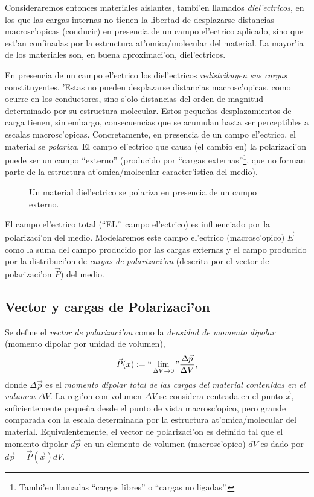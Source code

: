 Consideraremos entonces materiales aislantes, tambi'en llamados \textit{diel'ectricos}, en los que las cargas internas no tienen la
libertad de desplazarse distancias macrosc'opicas (conducir) en presencia de un
campo el'ectrico aplicado, sino que est'an confinadas por la estructura
at'omica/molecular del material. La mayor'ia de los materiales son, en buena
aproximaci'on, diel'ectricos.

En presencia de un campo el'ectrico los diel'ectricos \textit{redistribuyen sus cargas} constituyentes. 'Estas no pueden desplazarse distancias macrosc'opicas,
como ocurre en los conductores, sino s'olo distancias del orden de magnitud determinado por su estructura molecular.
Estos peque\~nos desplazamientos de carga tienen, sin embargo, consecuencias
que se acumulan hasta ser perceptibles a escalas macrosc'opicas.
Concretamente, en presencia de un campo el'ectrico, el material
se \textit{polariza}.
El campo el'ectrico que causa (el cambio en) la polarizaci'on puede ser un campo ``externo'' (producido por ``cargas externas''\footnote{Tambi'en llamadas ``cargas libres'' o ``cargas no ligadas''.}, que no forman parte
de la estructura at'omica/molecular caracter'istica del medio).
\begin{figure}[!h]
\centerline{}
\caption{Un material diel'ectrico se polariza en presencia de un campo externo.}
\label{diel01}
\end{figure}

El campo el'ectrico total (``EL''\, campo el'ectrico) es influenciado por
la polarizaci'on del medio. Modelaremos este campo el'ectrico
(macrosc'opico) $\vec{E}$ como la suma del campo
producido por las cargas externas y el campo producido por la distribuci'on
de \textit{cargas de polarizaci'on} (descrita por el vector de polarizaci'on $\vec{P}$) del medio.

\subsection{Vector y cargas de Polarizaci'on}

Se define el \textit{vector de polarizaci'on} como la \textit{densidad de
momento dipolar} (momento dipolar por unidad de volumen),
\begin{equation}\label{defP}
\vec{P}(x):= ``\lim_{\Delta V\to 0}" \frac{\Delta\vec{p}}{\Delta V},
\end{equation}
donde $\Delta\vec{p}$ es el \textit{momento dipolar total de las cargas del material contenidas en el volumen} $\Delta V$. La regi'on con volumen $\Delta V$ se considera centrada en el punto $\vec{x}$, suficientemente peque\~na desde el punto de vista macrosc'opico, pero grande comparada con la escala  determinada por la estructura at'omica/molecular del material. Equivalentemente, el vector de polarizaci'on es definido tal que el momento dipolar $d\vec{p}$ en un elemento de volumen (macrosc'opico) $dV$ es dado por $d\vec{p}=\vec{P}(\vec{x})dV$.

